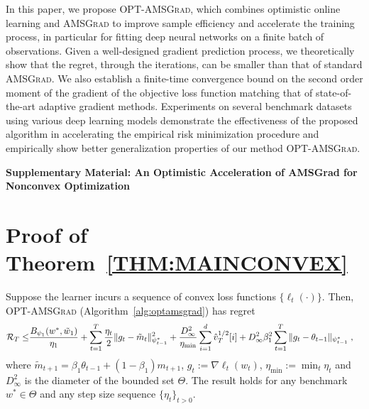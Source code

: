 \documentclass[wcp]{jmlr}
\begin{document}
In this paper, we propose \textsc{OPT-AMSGrad}, which combines optimistic online learning and \textsc{AMSGrad} to improve sample efficiency and accelerate the training process, in particular for fitting deep neural networks on a finite batch of observations. 
Given a well-designed gradient prediction process, we theoretically show that the regret, through the iterations, can be smaller than that of standard \textsc{AMSGrad}.
We also establish a finite-time convergence bound on the second order moment of the gradient of the objective loss function matching that of state-of-the-art adaptive gradient methods.
Experiments on several benchmark datasets using various deep learning models demonstrate the effectiveness of the proposed algorithm in accelerating the empirical risk minimization procedure and empirically show better generalization properties of our method \textsc{OPT-AMSGrad}.






\clearpage




\appendix

  
{\Large\bfseries Supplementary Material: An Optimistic Acceleration of AMSGrad for Nonconvex Optimization \par}


\section{Proof of Theorem~\ref{THM:MAINCONVEX}}\label{app:thmmainconvex}
\begin{Theorem*}
Suppose the learner incurs a sequence of convex loss functions $\{ \ell_{t}(\cdot) \}$.
Then,  \textsc{OPT-AMSGrad} (Algorithm~\ref{alg:optamsgrad}) has regret 
\begin{equation}\notag
\begin{aligned}
\mathcal{R}_T \leq &   \frac{ B_{\psi_1}(w^*, \tilde{w}_{1})}{\eta_1}
+ \sum_{t=1}^T\frac{\eta_t}{2} \| g_t - \tilde{m}_t  \|_{\psi_{t-1}^*}^2  + \frac{D_{\infty}^2}{\eta_{\min}}  \sum_{i=1}^d \hat{v}_{T}^{1/2}[i] + D_{\infty}^2\beta_1^2   \sum_{t=1}^T  \| g_t - \theta_{t-1}  \|_{\psi_{t-1}^*}\eqsp,
\end{aligned}
\end{equation}
where $ \tilde{m}_{t+1}  = \beta_1 \theta_{t-1} +(1-\beta_1) m_{t+1}$, $g_{t}:= \nabla \ell_{t}(w_t)$, $\eta_{{\min}} := \min_{{t}} \eta_{t}$ and $D_{\infty}^2$ is the diameter of the bounded set $\Theta$.
The result holds for any benchmark $w^{*} \in \Theta$ and any step size sequence $\{ \eta_t \}_{t>0}$.
\end{Theorem*}
\end{document}
